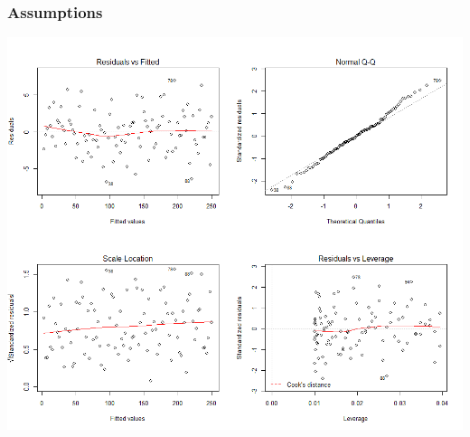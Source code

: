 \documentclass{beamer}
\begin{document}
\begin{frame}
\frametitle{Assumptions}
\includegraphics[width=\linewidth,height=\textheight,keepaspectratio=true]{lmplot.png}
\end{frame}
 
\end{document}
